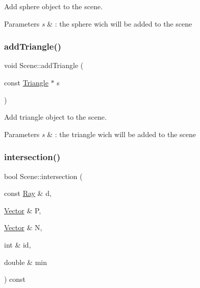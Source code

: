 Add sphere object to the scene. 


\begin{DoxyParams}{Parameters}
{\em s} & \+: the sphere wich will be added to the scene \\
\hline
\end{DoxyParams}
\mbox{\label{classScene_a2a8ed37427379fed62a9a71e7d266223}} 
\subsubsection{\texorpdfstring{add\+Triangle()}{addTriangle()}}
{\footnotesize\ttfamily void Scene\+::add\+Triangle (\begin{DoxyParamCaption}\item[{const \hyperlink{classTriangle}{Triangle} $\ast$}]{s }\end{DoxyParamCaption})\hspace{0.3cm}{\ttfamily [inline]}}



Add triangle object to the scene. 


\begin{DoxyParams}{Parameters}
{\em s} & \+: the triangle wich will be added to the scene \\
\hline
\end{DoxyParams}
\mbox{\label{classScene_a2006d6fa80e8bf343da5a8ed3d1f5140}} 
\subsubsection{\texorpdfstring{intersection()}{intersection()}}
{\footnotesize\ttfamily bool Scene\+::intersection (\begin{DoxyParamCaption}\item[{const \hyperlink{classRay}{Ray} \&}]{d,  }\item[{\hyperlink{classVector}{Vector} \&}]{P,  }\item[{\hyperlink{classVector}{Vector} \&}]{N,  }\item[{int \&}]{id,  }\item[{double \&}]{min }\end{DoxyParamCaption}) const\hspace{0.3cm}{\ttfamily [inline]}}



